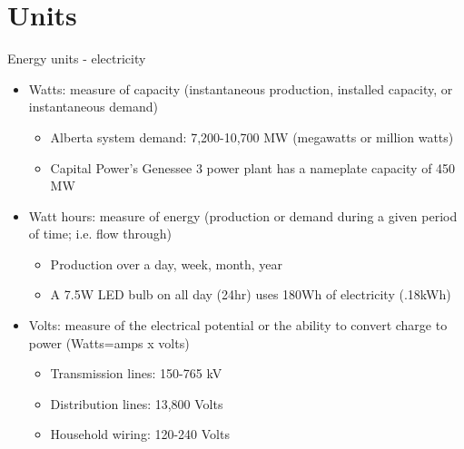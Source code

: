 \documentclass[aspectratio=169]{beamer}
\renewcommand{\(}{\begin{columns}}
\renewcommand{\)}{\end{columns}}
\newcommand{\<}[1]{\begin{column}{#1}}
\renewcommand{\>}{\end{column}}
\begin{document}
\section{Units}

\begin{frame}{Energy units - electricity}
\begin{itemize}
\setlength\itemsep{.75em}
\item Watts: measure of capacity (instantaneous production, installed capacity, or instantaneous demand)
\begin{itemize}
\setlength\itemsep{.5em}
\item Alberta system demand: 7,200-10,700 MW (megawatts or million watts)
\item Capital Power's Genessee 3 power plant has a nameplate capacity of 450 MW
\end{itemize}
\item Watt hours: measure of energy (production or demand during a given period of time; i.e. flow through)
\begin{itemize}
\setlength\itemsep{.5em}
\item Production over a day, week, month, year
\item A 7.5W LED bulb on all day (24hr) uses 180Wh of electricity (.18kWh)
\end{itemize}
\item Volts: measure of the electrical potential or the ability to convert charge to power (Watts=amps x volts)
\begin{itemize}
\setlength\itemsep{.5em}
\item Transmission lines: 150-765 kV
\item Distribution lines: 13,800 Volts
\item Household wiring: 120-240 Volts
\end{itemize}
\end{itemize}
\vfill \end{frame}
\end{document}
